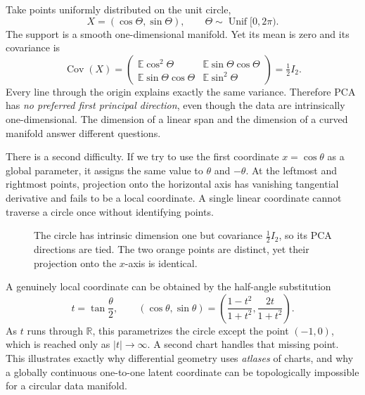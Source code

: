Take points uniformly distributed on the unit circle,
\[
 X=(\cos\Theta,\sin\Theta),
 \qquad\Theta\sim\operatorname{Unif}[0,2\pi).
\]
The support is a smooth one-dimensional manifold. Yet its mean is zero and its covariance is
\[
 \operatorname{Cov}(X)
 =\begin{pmatrix}
   \mathbb E\cos^2\Theta&\mathbb E\sin\Theta\cos\Theta\\
   \mathbb E\sin\Theta\cos\Theta&\mathbb E\sin^2\Theta
  \end{pmatrix}
 =\tfrac12 I_2.
\]
Every line through the origin explains exactly the same variance. Therefore PCA has \emph{no preferred first principal direction}, even though the data are intrinsically one-dimensional. The dimension of a linear span and the dimension of a curved manifold answer different questions.

There is a second difficulty. If we try to use the first coordinate $x=\cos\theta$ as a global parameter, it assigns the same value to $\theta$ and $-\theta$. At the leftmost and rightmost points, projection onto the horizontal axis has vanishing tangential derivative and fails to be a local coordinate. A single linear coordinate cannot traverse a circle once without identifying points.

\begin{figure}[H]
\centering
{}
\caption{The circle has intrinsic dimension one but covariance $\tfrac12I_2$, so its PCA directions are tied. The two orange points are distinct, yet their projection onto the $x$-axis is identical.}
\end{figure}

A genuinely local coordinate can be obtained by the half-angle substitution
\[
 t=\tan\frac\theta2,\qquad
 (\cos\theta,\sin\theta)
 =\left(\frac{1-t^2}{1+t^2},\frac{2t}{1+t^2}\right).
\]
As $t$ runs through $\mathbb R$, this parametrizes the circle except the point $(-1,0)$, which is reached only as $|t|\to\infty$. A second chart handles that missing point. This illustrates exactly why differential geometry uses \emph{atlases} of charts, and why a globally continuous one-to-one latent coordinate can be topologically impossible for a circular data manifold.

